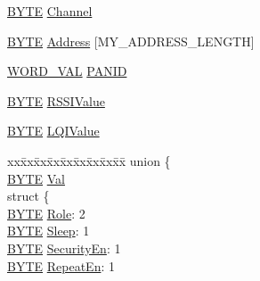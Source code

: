 \begin{DoxyCompactItemize}
\item 
\hyperlink{_generic_type_defs_8h_a4ae1dab0fb4b072a66584546209e7d58}{B\+Y\+T\+E} \hyperlink{struct_a_c_t_i_v_e___s_c_a_n___r_e_s_u_l_t_ac3cb449c59af24bba3558e7877a5f6d3}{Channel}
\item 
\hyperlink{_generic_type_defs_8h_a4ae1dab0fb4b072a66584546209e7d58}{B\+Y\+T\+E} \hyperlink{struct_a_c_t_i_v_e___s_c_a_n___r_e_s_u_l_t_ac1d21f82df5bb86803475c1ee98f9dc5}{Address} \mbox{[}M\+Y\+\_\+\+A\+D\+D\+R\+E\+S\+S\+\_\+\+L\+E\+N\+G\+T\+H\mbox{]}
\item 
\hyperlink{union_w_o_r_d___v_a_l}{W\+O\+R\+D\+\_\+\+V\+A\+L} \hyperlink{struct_a_c_t_i_v_e___s_c_a_n___r_e_s_u_l_t_a5a2b76ccf7e6b82de7ed819e1a10f56e}{P\+A\+N\+I\+D}
\item 
\hyperlink{_generic_type_defs_8h_a4ae1dab0fb4b072a66584546209e7d58}{B\+Y\+T\+E} \hyperlink{struct_a_c_t_i_v_e___s_c_a_n___r_e_s_u_l_t_a34c2248f7928a3f59a8a211a051ae2c0}{R\+S\+S\+I\+Value}
\item 
\hyperlink{_generic_type_defs_8h_a4ae1dab0fb4b072a66584546209e7d58}{B\+Y\+T\+E} \hyperlink{struct_a_c_t_i_v_e___s_c_a_n___r_e_s_u_l_t_a03c6d7bc86aaee25e11a68e57608ddcc}{L\+Q\+I\+Value}
\item 
\begin{tabbing}
xx\=xx\=xx\=xx\=xx\=xx\=xx\=xx\=xx\=\kill
union \{\\
\>\hyperlink{_generic_type_defs_8h_a4ae1dab0fb4b072a66584546209e7d58}{BYTE} \hyperlink{struct_a_c_t_i_v_e___s_c_a_n___r_e_s_u_l_t_a5ab8c2bf45b20b5f7aa3a4f083896cec}{Val}\\
\>struct \{\\
\>\>\hyperlink{_generic_type_defs_8h_a4ae1dab0fb4b072a66584546209e7d58}{BYTE} \hyperlink{struct_a_c_t_i_v_e___s_c_a_n___r_e_s_u_l_t_abdc97da64a8198a9434a89bb7e29f8ab}{Role}: 2\\
\>\>\hyperlink{_generic_type_defs_8h_a4ae1dab0fb4b072a66584546209e7d58}{BYTE} \hyperlink{struct_a_c_t_i_v_e___s_c_a_n___r_e_s_u_l_t_a0cc3c0ef2e6a8dc40d7eb8d5f7dfdd93}{Sleep}: 1\\
\>\>\hyperlink{_generic_type_defs_8h_a4ae1dab0fb4b072a66584546209e7d58}{BYTE} \hyperlink{struct_a_c_t_i_v_e___s_c_a_n___r_e_s_u_l_t_a8e70babc4438df92932df24dbfb31edd}{SecurityEn}: 1\\
\>\>\hyperlink{_generic_type_defs_8h_a4ae1dab0fb4b072a66584546209e7d58}{BYTE} \hyperlink{struct_a_c_t_i_v_e___s_c_a_n___r_e_s_u_l_t_ab59b6f04b1f51d0a916b10ffe9538bb9}{RepeatEn}: 1\\

\end{tabbing}
\end{DoxyCompactItemize}
